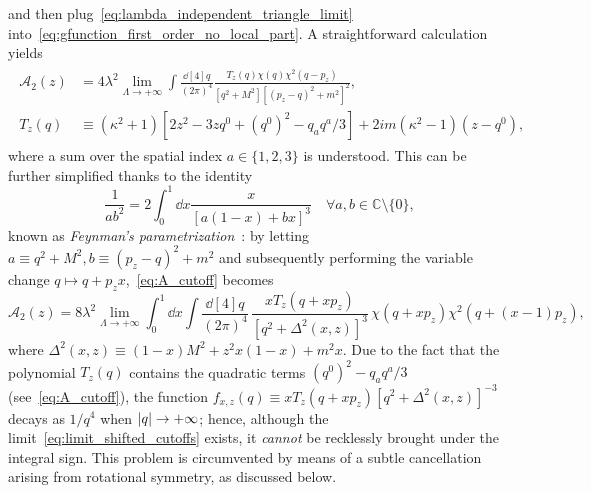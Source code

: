 \documentclass[a4paper, 11pt]{article}
\newcommand{\C}{\mathbb{C}}
\newcommand{\cutoff}{\Lambda}								%
\theoremstyle{thm}
\begin{document}
and then plug~\eqref{eq:lambda_independent_triangle_limit} into~\eqref{eq:gfunction_first_order_no_local_part}. A straightforward calculation yields
\begin{align}
\label{eq:A_cutoff}
\begin{split}
\mathcal{A}_2(z) 
& = 4 \lambda^2 \lim_{\cutoff \to +\infty} \int \frac{\dd[4]{q}}{(2\pi)^4} \frac{T_z(q) \chi(q) \chi^2(q - p_z)}{[q^2 + M^2][(p_z - q)^2 + m^2]^2}, \\
T_z(q) 
& \equiv (\kappa^2 + 1)[2 z^2 - 3 z q^0 + (q^0)^2 - q_a q^a/3] + 2im(\kappa^2 - 1)(z - q^0),
\end{split}
\end{align}
where a sum over the spatial index $a \in \lbrace 1, 2, 3 \rbrace$ is understood. This can be further simplified thanks to the identity
\begin{equation}
\label{eq:feynman_parametrization}
\frac{1}{ab^2} = 2 \int_0^1 \dd{x} \frac{x}{[a(1 - x) + bx]^3} \quad \forall a, b \in \C \setminus \lbrace 0 \rbrace,
\end{equation}
known as \emph{Feynman's parametrization}~\cite[Appendix B.1.1]{Schwartz_2013}: by letting $a \equiv q^2 + M^2, b \equiv (p_z - q)^2 + m^2$ and subsequently performing the variable change $q \mapsto q + p_z x$,~\eqref{eq:A_cutoff} becomes
\begin{equation}
\label{eq:limit_shifted_cutoffs}
\mathcal{A}_2(z) = 8 \lambda^2 \lim_{\cutoff \to +\infty} \int_0^1 \dd{x} \int \frac{\dd[4]{q}}{(2\pi)^4} \, \frac{x T_z(q + x p_z)}{[q^2 + \Delta^2(x, z)]^3} \, \chi(q + x p_z) \chi^2(q + (x - 1)p_z),
\end{equation}
where $\Delta^2(x, z) \equiv (1 - x)M^2 + z^2x(1-x) + m^2 x$. Due to the fact that the polynomial $T_z(q)$ contains the quadratic terms $(q^0)^2 - q_a q^a/3$ (see~\eqref{eq:A_cutoff}), the function $f_{x, z}(q) \equiv x T_z(q + x p_z)[q^2 + \Delta^2(x, z)]^{-3}$ decays as $1/q^4$ when $\abs{q} \to +\infty$; hence, although the limit~\eqref{eq:limit_shifted_cutoffs} exists, it \emph{cannot} be recklessly brought under the integral sign. This problem is circumvented by means of a subtle cancellation arising from rotational symmetry, as discussed below.
\end{document}
